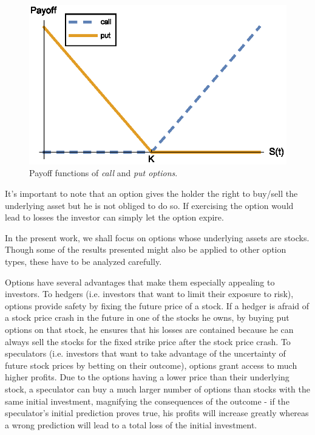 \documentclass[a4paper,twocolumn,aps,prd,longbibliography,superscriptaddress]{revtex4-1}
\begin{document}
\begin{figure}[H]
    \centering
      \includegraphics[width=.9\columnwidth]{Payoff.eps}
      \caption{Payoff functions of \textit{call} and \textit{put options}.}\label{fig:Payoff}
    \end{figure}

It's important to note that an option gives the holder the right to buy/sell the underlying asset but he is not obliged to do so. If exercising the option would lead to losses the investor can simply let the option expire.

In the present work, we shall focus on options whose underlying assets are stocks. Though some of the results presented might also be applied to other option types, these have to be analyzed carefully.


Options have several advantages that make them especially appealing to investors.
To hedgers (i.e. investors that want to limit their exposure to risk), options provide safety by fixing the future price of a stock. If a hedger is afraid of a stock price crash in the future in one of the stocks he owns, by buying put options on that stock, he ensures that his losses are contained because he can always sell the stocks for the fixed strike price after the stock price crash.
To speculators (i.e. investors that want to take advantage of the uncertainty of future stock prices by betting on their outcome), options grant access to much higher profits. Due to the options having a lower price than their underlying stock, a speculator can buy a much larger number of options than stocks with the same initial investment, magnifying the consequences of the outcome - if the speculator's initial prediction proves true, his profits will increase greatly whereas a wrong prediction will lead to a total loss of the initial investment.
\end{document}
